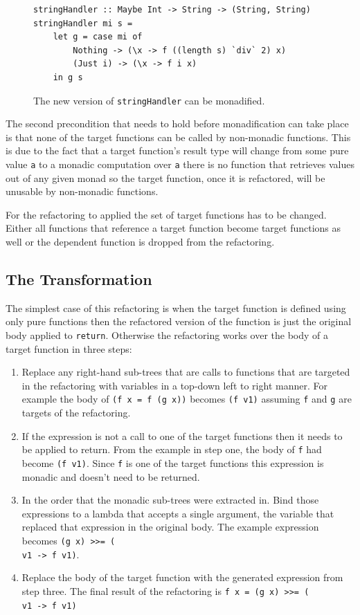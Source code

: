 \begin{figure}[t]
\begin{lstlisting}
stringHandler :: Maybe Int -> String -> (String, String)
stringHandler mi s = 
	let g = case mi of
		Nothing -> (\x -> f ((length s) `div` 2) x)
		(Just i) -> (\x -> f i x)
	in g s
\end{lstlisting}
\caption{The new version of \texttt{stringHandler} can be monadified.}
\label{etaHan}
\end{figure}

The second precondition that needs to hold before monadification can take place is that none of the target functions can be called by non-monadic functions. This is due to the fact that a target function's result type will change from some pure value \texttt{a} to a monadic computation over \texttt{a} there is no function that retrieves values out of any given monad so the target function, once it is refactored, will be unusable by non-monadic functions. 

For the refactoring to applied the set of target functions has to be changed. Either all functions that reference a target function become target functions as well or the dependent function is dropped from the refactoring.

\subsection{The Transformation}

The simplest case of this refactoring is when the target function is defined using only pure functions then the refactored version of the function is just the original body applied to \texttt{return}. Otherwise the refactoring works over the body of a target function in three steps:

\begin{enumerate}
\item Replace any right-hand sub-trees that are calls to functions that are targeted in the refactoring with variables in a top-down left to right manner. For example the body of \texttt{(f x = f (g x))} becomes \texttt{(f v1)} assuming \texttt{f} and \texttt{g} are targets of the refactoring.
\item If the expression is not a call to one of the target functions then it needs to be applied to return. From the example in step one, the body of \texttt{f} had become \texttt{(f v1)}. Since \texttt{f} is one of the target functions this expression is monadic and doesn't need to be returned.
\item In the order that the monadic sub-trees were extracted in. Bind those expressions to a lambda that accepts a single argument, the variable that replaced that expression in the original body. The example expression becomes \texttt{(g x) >>= (\\v1 -> f v1)}.
\item Replace the body of the target function with the generated expression from step three. The final result of the refactoring is \texttt{f x = (g x) >>= (\\v1 -> f v1)}
\end{enumerate}

